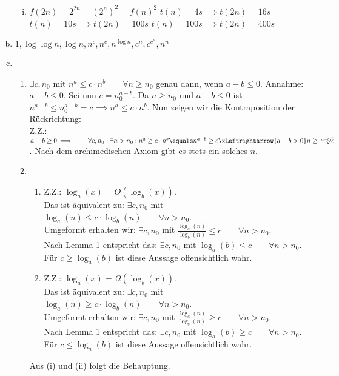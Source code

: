 \documentclass{article}
\begin{document}
\begin{enumerate}[a)]
\begin{enumerate}[i)]
		\item $f(2n) = 2^{2n} = (2^n)^2 = f(n)^2$
		\subitem $t(n) = 4s \implies t(2n) = 16 s$
		\subitem $t(n) = 10s \implies t(2n) = 100 s$
		\subitem $t(n) = 100s \implies t(2n) = 400 s$
	\end{enumerate}
	\item  $1, \log \log n, \log n, n^\epsilon, n^c, n^{\log n}, c^n, c^{c^n}, n^n$
	\item \begin{enumerate}[1.]
		\item $\exists c, n_0$ mit $n^a \leq c\cdot n^b \quad \quad \forall n\geq n_0$ genau dann, wenn $a-b\leq 0$.
		Annahme: $a-b\leq 0$. Sei nun $c = n_0^{a-b}$. Da $n \geq n_0$ und $a-b\leq 0$ ist $n^{a-b}\leq n_0^{a-b} = c \implies n^a\leq c\cdot n^b$.
		Nun zeigen wir die Kontraposition der Rückrichtung:\\
		Z.Z.: $a-b\geq 0 \implies \quad \quad \forall c, n_0: \exists n > n_0: n^a \geq c\cdot n^b \equals n^{a-b} \geq c \xLeftrightarrow{a-b > 0} n \geq \sqrt[a-b]{c}$. Nach dem archimedischen Axiom gibt es stets ein solches $n$.
		\item \begin{enumerate}
			\item Z.Z.: $\log_a(x) = O(\log_b(x))$.\\
			Das ist äquivalent zu: $\exists c,n_0$ mit $\log_a(n) \leq c\cdot \log_b(n) \quad \quad \forall n> n_0 $.\\
			Umgeformt erhalten wir: $\exists c,n_0$ mit $\frac{\log_a(n)}{\log_b(n)} \leq c \quad \quad \forall n> n_0$.\\
			Nach Lemma 1 entspricht das: $\exists c,n_0$ mit $\log_a(b) \leq c \quad \quad \forall n> n_0$.\\
			Für $c \geq \log_a(b)$ ist diese Aussage offensichtlich wahr.
			\item Z.Z.: $\log_a(x) = \Omega(\log_b(x))$.\\
			Das ist äquivalent zu: $\exists c,n_0$ mit $\log_a(n) \geq c\cdot \log_b(n) \quad \quad \forall n> n_0 $.\\
			Umgeformt erhalten wir: $\exists c,n_0$ mit $\frac{\log_a(n)}{\log_b(n)} \geq c \quad \quad \forall n> n_0$.\\
			Nach Lemma 1 entspricht das: $\exists c,n_0$ mit $\log_a(b) \geq c \quad \quad \forall n> n_0$.\\
			Für $c \leq \log_a(b)$ ist diese Aussage offensichtlich wahr.
		\end{enumerate}
		Aus (i) und (ii) folgt die Behauptung.

\end{enumerate}
\end{enumerate}
\end{document}
